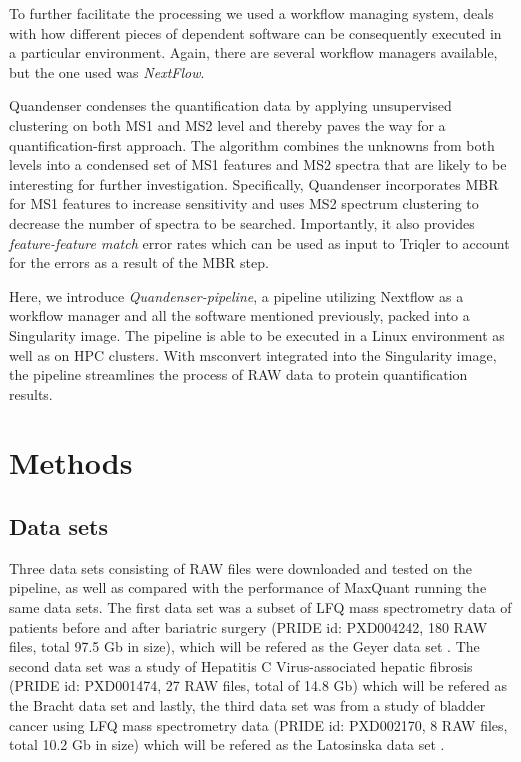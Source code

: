 \documentclass[11pt]{article}
\begin{document}
To further facilitate the processing we used a workflow managing system, deals with how different pieces of dependent software can be consequently executed in a particular environment. Again, there are several workflow managers available, but the one used was \textit{NextFlow}\cite{di2017nextflow}.

Quandenser condenses the quantification data by applying unsupervised clustering on both MS1 and MS2 level and thereby paves the way for a quantification-first approach. The algorithm combines the unknowns from both levels into a condensed set of MS1 features and MS2 spectra that are likely to be interesting for further investigation. Specifically, Quandenser incorporates MBR for MS1 features to increase sensitivity and uses MS2 spectrum clustering to decrease the number of spectra to be searched. Importantly, it also provides {\em feature-feature match} error rates which can be used as input to Triqler to account for the errors as a result of the MBR step.

Here, we introduce \textit{Quandenser-pipeline}, a pipeline utilizing Nextflow as a workflow manager and all the software mentioned previously, packed into a Singularity image. The pipeline is able to be executed in a Linux environment as well as on HPC clusters. With msconvert integrated into the Singularity image, the pipeline streamlines the process of RAW data to protein quantification results.

\section*{Methods}

\subsection*{Data sets}
Three data sets consisting of RAW files were downloaded and tested on the pipeline, as well as compared with the performance of MaxQuant running the same data sets. The first data set was a subset of LFQ mass spectrometry data of patients before and after bariatric surgery (PRIDE id: PXD004242, 180 RAW files, total 97.5 Gb in size), which will be refered as the Geyer data set \cite{geyer2016bartric}. The second data set was a study of Hepatitis C Virus-associated hepatic fibrosis (PRIDE id: PXD001474, 27 RAW files, total of 14.8 Gb) which will be refered as the Bracht data set and lastly, the third data set was from a study of bladder cancer using LFQ mass spectrometry data (PRIDE id: PXD002170, 8 RAW files, total 10.2 Gb in size) which will be refered as the Latosinska data set \cite{bracht2015analysis} \cite{latosinska2015comparative}.
\end{document}
